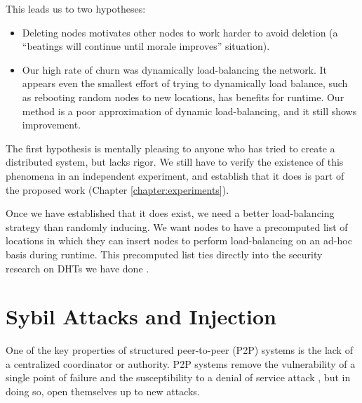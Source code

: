 This leads us to two hypotheses:
\begin{itemize}
	\item Deleting nodes motivates other nodes to work harder to avoid deletion (a ``beatings will continue until morale improves'' situation).
	\item Our high rate of churn was dynamically load-balancing the network.
	It appears even the smallest effort of trying to dynamically load balance, such as rebooting random nodes to new locations, has benefits for runtime.
	Our method is a poor approximation of dynamic load-balancing, and it still shows improvement.
\end{itemize}

The first hypothesis is mentally pleasing to anyone who has tried to create a distributed system, but lacks rigor.
We still have to verify the existence of this phenomena in an independent experiment, and establish that it does is part of the proposed work (Chapter \ref{chapter:experiments}).


Once we have established that it does exist, we need a better load-balancing strategy than randomly inducing.
We want nodes to have a precomputed list of locations in which they can insert nodes to perform load-balancing on an ad-hoc basis during runtime.
This precomputed list ties directly into the security research on DHTs we have done \cite{sybil-analysis}.









\section{Sybil Attacks and Injection}
One of the key properties of structured peer-to-peer (P2P) systems is the lack of a centralized coordinator or authority.
P2P systems remove the vulnerability of a single point of failure and the susceptibility to a denial of service attack \cite{sybil}, but in doing so, open themselves up to new attacks.

